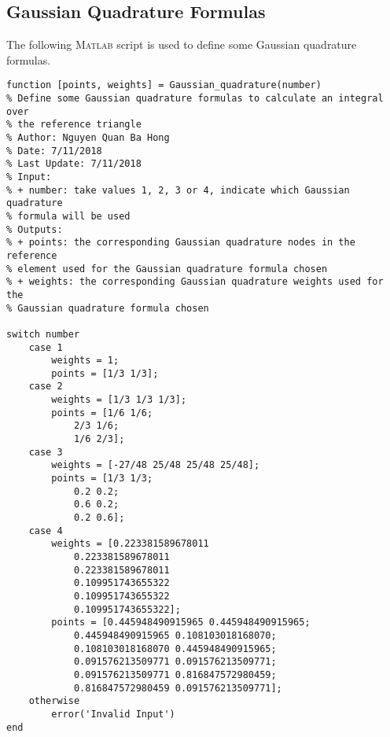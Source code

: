\documentclass[11pt,a4paper,center,notitlepage]{article}
\numberwithin{equation}{section}
\begin{document}
\subsection{Gaussian Quadrature Formulas}\label{sec8.2}
The following \textsc{Matlab} script is used to define some Gaussian quadrature formulas.
\begin{verbatim}
function [points, weights] = Gaussian_quadrature(number)
% Define some Gaussian quadrature formulas to calculate an integral over
% the reference triangle
% Author: Nguyen Quan Ba Hong
% Date: 7/11/2018
% Last Update: 7/11/2018
% Input:
% + number: take values 1, 2, 3 or 4, indicate which Gaussian quadrature
% formula will be used
% Outputs:
% + points: the corresponding Gaussian quadrature nodes in the reference
% element used for the Gaussian quadrature formula chosen
% + weights: the corresponding Gaussian quadrature weights used for the
% Gaussian quadrature formula chosen

switch number
    case 1
        weights = 1;
        points = [1/3 1/3];
    case 2
        weights = [1/3 1/3 1/3];
        points = [1/6 1/6;
            2/3 1/6;
            1/6 2/3];
    case 3
        weights = [-27/48 25/48 25/48 25/48];
        points = [1/3 1/3;
            0.2 0.2;
            0.6 0.2;
            0.2 0.6];
    case 4
        weights = [0.223381589678011
            0.223381589678011
            0.223381589678011
            0.109951743655322
            0.109951743655322
            0.109951743655322];
        points = [0.445948490915965 0.445948490915965;
            0.445948490915965 0.108103018168070;
            0.108103018168070 0.445948490915965;
            0.091576213509771 0.091576213509771;
            0.091576213509771 0.816847572980459;
            0.816847572980459 0.091576213509771];
    otherwise
        error('Invalid Input')
end
\end{verbatim}
\end{document}
